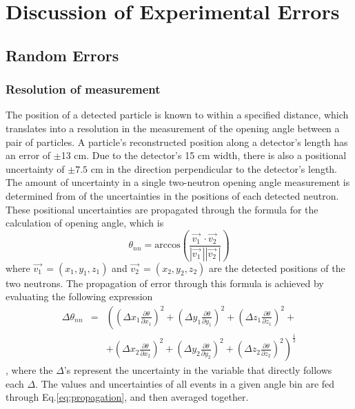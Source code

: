 \chapter{Discussion of Experimental Errors}
\label{Errors}
\section{Random Errors}
\subsection{Resolution of measurement}
The position of a detected particle is known to within a specified distance, which translates into a resolution in the measurement of the opening angle between a pair of particles.
A particle's reconstructed position along a detector's length has an error of $\pm$13 cm.
Due to the detector's 15 cm width, there is also a positional uncertainty of $\pm 7.5$ cm in the direction perpendicular to the detector's length.
The amount of uncertainty in a single two-neutron opening angle measurement is determined from of the uncertainties in the positions of each detected neutron.
These positional uncertainties are propagated through the formula for the calculation of opening angle, which is
\begin{displaymath}
    \theta_{nn} = \text{arccos}\left(\frac{\vec{v_{1}}^{\,}\cdot\vec{v_{2}}^{\,}}{|\vec{v_{1}}^{\,}||\vec{v_{2}}^{\,}|}\right)
\end{displaymath}
where $\vec{v_{1}}^{\,} = (x_1,y_1,z_1)$ and $\vec{v_{2}}^{\,} = (x_2,y_2,z_2)$ are the detected positions of the two neutrons.
The propagation of error through this formula is achieved by evaluating the following expression
\begin{eqnarray*}
\label{eq:propagation}
 \Delta \theta_{nn} & = & \left( \left(\Delta x_1 \frac{\partial \theta}{\partial x_1}\right)^{2} + \left(\Delta y_1 \frac{\partial \theta}{\partial y_1}\right)^{2} + \left(\Delta z_1 \frac{\partial \theta}{\partial z_1}\right)^{2} + \right. \\
 & & \left. + \left(\Delta x_2 \frac{\partial \theta}{\partial x_2}\right)^{2} + \left(\Delta y_2\frac{\partial \theta}{\partial y_2}\right)^{2} + \left(\Delta z_2 \frac{\partial \theta}{\partial z_2}\right)^{2} \right) ^{\frac{1}{2}}
\end{eqnarray*}
, where the $\Delta$'s represent the uncertainty in the variable that directly follows each $\Delta$.
The values and uncertainties of all events in a given angle bin are fed through Eq.\ref{eq:propagation}, and then averaged together.
